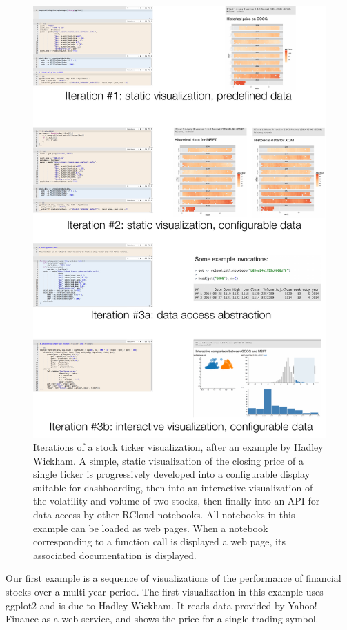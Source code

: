 \begin{figure}
\includegraphics[width=\linewidth]{fig/casestudy1/casestudy1.pdf}
\caption{\label{sec:stockvis}Iterations of a stock ticker
  visualization, after an example by Hadley Wickham.  A
  simple, static visualization of the closing price of a single ticker
  is progressively developed into a configurable display suitable
  for dashboarding, then into an interactive visualization of the
  volatility and volume of two stocks, then finally into an API
  for data access by other RCloud notebooks. All notebooks
  in this example can be loaded as web pages. When a notebook
  corresponding to a function call is displayed a web page,
  its associated documentation is displayed.}
\end{figure}

Our first example is a sequence of visualizations of the performance
of financial stocks over a multi-year period. The first visualization
in this example uses ggplot2 and is due to Hadley Wickham. It reads
data provided by Yahoo! Finance as a web service, and shows the price
for a single trading symbol.

